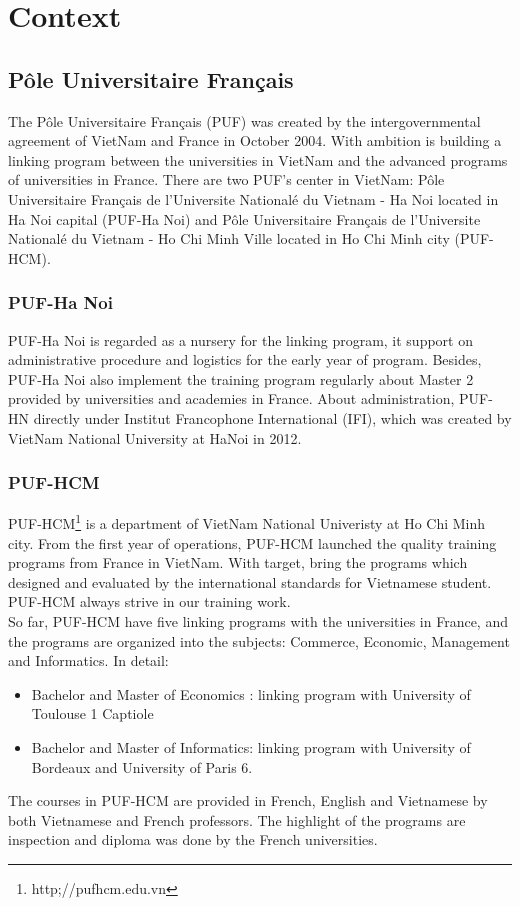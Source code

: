 \chapter{Context}
\section{P\^{o}le Universitaire Fran\c{c}ais}
The P\^{o}le Universitaire Fran\c{c}ais (PUF) was created by the intergovernmental agreement of VietNam and France in October 2004. With ambition is building a linking program between the universities in VietNam and the advanced programs of universities in France. There are two PUF's center in VietNam: P\^{o}le Universitaire Fran\c{c}ais de l'Universite National\'{e} du Vietnam - Ha Noi located in Ha Noi capital (PUF-Ha Noi) and P\^{o}le Universitaire Fran\c{c}ais de l'Universite National\'{e} du Vietnam - Ho Chi Minh Ville located in Ho Chi Minh city (PUF-HCM).
\subsection{PUF-Ha Noi}
PUF-Ha Noi is regarded as a nursery for the linking program, it support on administrative procedure and logistics for the early year of program. Besides, PUF-Ha Noi also implement the training program regularly about Master 2 provided by universities and academies in France. About administration, PUF-HN directly under Institut Francophone International (IFI), which was created by VietNam National University at HaNoi in 2012.
\subsection{PUF-HCM}
PUF-HCM\footnote{http;//pufhcm.edu.vn} is a department of VietNam National Univeristy at Ho Chi Minh city. From the first year of operations, PUF-HCM launched the quality training programs from France in VietNam. With target, bring the programs which designed and evaluated by the international standards for Vietnamese student. PUF-HCM always strive in our training work.\\
So far, PUF-HCM have five linking programs with the universities in France, and the programs are organized into the subjects: Commerce, Economic, Management and Informatics. In detail:
\begin{itemize}
\item Bachelor and Master of Economics : linking program with University of Toulouse 1 Captiole
\item Bachelor and Master of Informatics: linking program with University of Bordeaux and University of Paris 6.
\end{itemize}
The courses in PUF-HCM are provided in French, English and Vietnamese by both Vietnamese and French professors. The highlight of the programs are inspection and diploma was done by the French universities.
